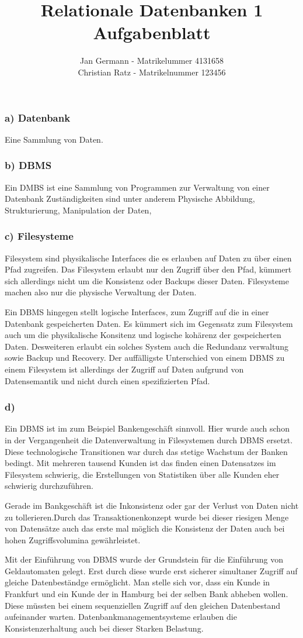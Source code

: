\documentclass[12pt,a4paper,DIV=9]{scrartcl}
\author{Jan Germann - Matrikelummer 4131658\\Christian Ratz - Matrikelnummer 123456}
\title{Relationale Datenbanken 1\\ Aufgabenblatt \blatt}
\newcounter{temp}
\newcommand{\aufgabe}[1]{
  \setcounter{temp}{\value{subsection}}
  \setcounter{subsection}{#1}
  \addtocounter{subsection}{-1}
  \subsection{}
  \setcounter{subsection}{\value{temp}}
}
\newcommand{\teil}[2][]{
  \subsubsection*{#2) #1}
}
\begin{document}
\maketitle

\aufgabe{2}
\teil[Datenbank]{a}
Eine Sammlung von Daten.

\teil[DBMS]{b}
  Ein DMBS ist eine Sammlung von Programmen zur Verwaltung von einer Datenbank
Zuständigkeiten sind unter anderem Physische Abbildung, Strukturierung, Manipulation der Daten,

\teil[Filesysteme]{c}
  Filesystem sind physikalische Interfaces die es erlauben auf Daten zu über einen Pfad zugreifen. Das Filesystem erlaubt nur den Zugriff über den Pfad, kümmert sich allerdings nicht um die Konsistenz oder Backups dieser Daten. Filesysteme machen also nur die physische Verwaltung der Daten.

  Ein DBMS hingegen stellt logische Interfaces, zum Zugriff auf die in einer Datenbank gespeicherten Daten. Es kümmert sich im Gegensatz zum Filesystem auch um die physikalische Konsitenz und logische kohärenz der gespeicherten Daten. Desweiteren erlaubt ein solches System auch die Redundanz verwaltung sowie Backup und Recovery. Der auffälligste Unterschied von einem DBMS zu einem Filesystem ist allerdings der Zugriff auf Daten aufgrund von Datensemantik und nicht durch einen spezifizierten Pfad.

\teil{d}
  Ein DBMS ist im zum Beispiel Bankengeschäft sinnvoll. Hier wurde auch schon in der Vergangenheit die Datenverwaltung in Filesystemen durch DBMS ersetzt. Diese technologische Transitionen war durch das stetige Wachstum der Banken bedingt. Mit mehreren tausend Kunden ist das finden einen Datensatzes im Filesystem schwierig, die Erstellungen von Statistiken über alle Kunden eher schwierig durchzuführen.

  Gerade im Bankgeschäft ist die Inkonsistenz oder gar der Verlust von Daten nicht zu tollerieren.Durch das Transaktionenkonzept wurde bei dieser riesigen Menge von Datensätze auch das erste mal möglich die Konsistenz der Daten auch bei hohen Zugriffsvolumina gewährleistet.

  Mit der Einführung von DBMS wurde der Grundstein für die Einführung von Geldautomaten gelegt. Erst durch diese wurde erst sicherer simultaner Zugriff auf gleiche Datenbeständge ermöglicht. Man stelle sich vor, dass ein Kunde in Frankfurt und ein Kunde der in Hamburg bei der selben Bank abheben wollen. Diese müssten bei einem sequenziellen Zugriff auf den gleichen Datenbestand aufeinander warten. Datenbankmanagementsysteme erlauben die Konsistenzerhaltung auch bei dieser Starken Belastung.
\end{document}
